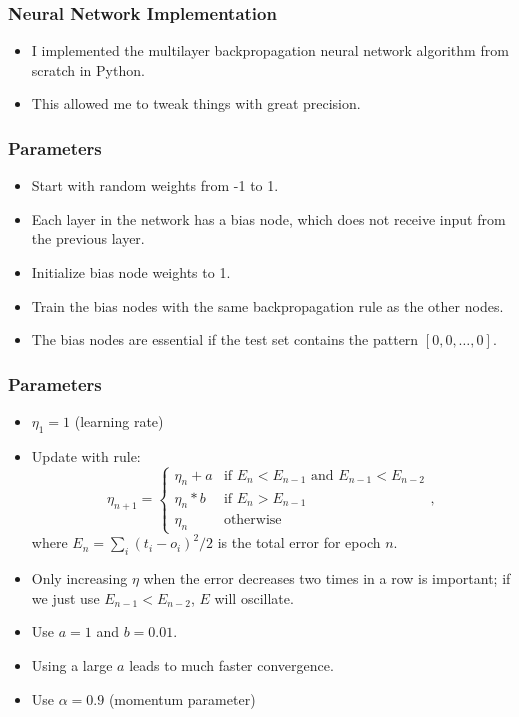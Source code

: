 \documentclass{beamer}
\numberwithin{equation}{section} %
\begin{document}
\begin{frame}
    \frametitle{Neural Network Implementation}
    \begin{itemize}
        \item I implemented the multilayer backpropagation neural network algorithm from scratch in Python.
        \pause
        \item This allowed me to tweak things with great precision.
    \end{itemize}
\end{frame}

\begin{frame}
    \frametitle{Parameters}
    \begin{itemize}
        \item Start with random weights from -1 to 1.
        \pause
        \item Each layer in the network has a bias node, which does not receive input from the previous layer.
        \pause
        \item Initialize bias node weights to 1.
        \pause
        \item Train the bias nodes with the same backpropagation rule as the other nodes.
        \pause
        \item The bias nodes are essential if the test set contains the pattern $[0, 0, \ldots, 0]$.
    \end{itemize}
\end{frame}

\begin{frame}
    \frametitle{Parameters}
    \begin{itemize}
        \item $\eta_1 = 1$ (learning rate)
        \pause
        \item Update with rule:
        \begin{equation}
            \eta_{n+1} =
            \begin{cases}
               \eta_n + a & \text{if } E_n < E_{n - 1} \text{ and } E_{n - 1} < E_{n - 2} \\
               \eta_n*b & \text{if }E_n > E_{n - 1} \\
               \eta_n & \text{otherwise}
          \end{cases},
        \end{equation}
        where $E_n=\sum_i{(t_i - o_i)^2}/2$ is the total error for epoch $n$.
        \pause
        \item Only increasing $\eta$ when the error decreases two times in a row is important; if we just use $E_{n - 1} < E_{n - 2}$, $E$ will oscillate.
        \pause
        \item Use $a=1$ and $b=0.01$.
        \pause
        \item Using a large $a$ leads to much faster convergence.
        \pause
        \item Use $\alpha = 0.9$ (momentum parameter)
    \end{itemize}
\end{frame}
\end{document}
